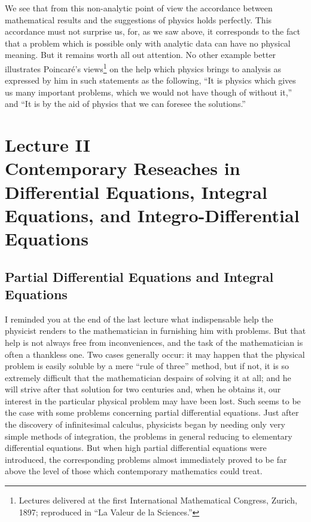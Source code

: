 \documentclass[12pt,oneside]{book}
\begin{document}
We see that from this non-analytic point of view the accordance between
mathematical results and the suggestions of physics holds perfectly. This
accordance must not surprise us, for, as we saw above, it corresponds to the
fact that a problem which is possible only with analytic data can have no
physical meaning. But it remains worth all out attention. No other example
better illustrates Poincar\'e's views\footnote{Lectures delivered at the first
International Mathematical Congress, Zurich, 1897; reproduced in ``La Valeur de la
Sciences.''} on the help which physics brings to analysis as expressed by him in
such statements as the following, ``It is physics which gives us many important
problems, which we would not have though of without it,'' and ``It is by the aid
of physics that we can foresee the solutions.'' \par

\chapter[Lecture II]{Lecture II\\Contemporary Reseaches in Differential
Equations, Integral Equations, and Integro-Differential Equations}

\section{Partial Differential Equations and Integral Equations}

I reminded you at the end of the last lecture what indispensable help the
physicist renders to the mathematician in furnishing him with problems. But that
help is not always free from inconveniences, and the task of the mathematician
is often a thankless one. Two cases generally occur: it may happen that the
physical problem is easily soluble by a mere ``rule of three'' method, but if
not, it is so extremely difficult that the mathematician despairs of solving it
at all; and he will strive after that solution for two centuries and, when he
obtains it, our interest in the particular physical problem may have been lost.
Such seems to be the case with some problems concerning partial differential
equations. Just after the discovery of infinitesimal calculus, physicists began
by needing only very simple methods of integration, the problems in general
reducing to elementary differential equations. But when high partial
differential equations were introduced, the corresponding problems almost
immediately proved to be far above the level of those which contemporary
mathematics could treat. \par
\end{document}
